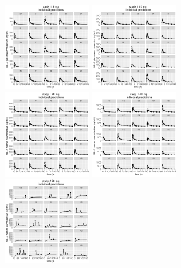 \documentclass[11pt]{amsart}
\begin{document}
\begin{figure}[htbp]
\includegraphics[width=1.5in,trim=0in 0in 0 0in]{graphics/effCptModelTorsten_0.82/effCptPlots011.pdf}
\includegraphics[width=1.5in,trim=0in 0in 0 0in]{graphics/effCptModelTorsten_0.82/effCptPlots012.pdf}
\includegraphics[width=1.5in,trim=0in 0in 0 0in]{graphics/effCptModelTorsten_0.82/effCptPlots013.pdf}
\includegraphics[width=1.5in,trim=0in 0in 0 0in]{graphics/effCptModelTorsten_0.82/effCptPlots014.pdf}
\includegraphics[width=1.5in,trim=0in 0in 0 0in]{graphics/effCptModelTorsten_0.82/effCptPlots019.pdf}

\end{figure}
\end{document}
